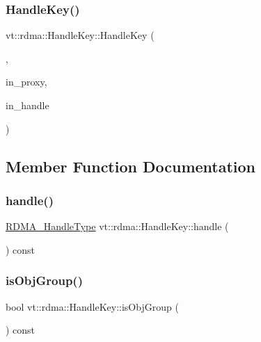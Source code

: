 \subsubsection{\texorpdfstring{Handle\+Key()}{HandleKey()}\hspace{0.1cm}{\footnotesize\ttfamily [3/3]}}
{\footnotesize\ttfamily vt\+::rdma\+::\+Handle\+Key\+::\+Handle\+Key (\begin{DoxyParamCaption}\item[{\hyperlink{structvt_1_1rdma_1_1_handle_key_1_1_collection_tag}{Collection\+Tag}}]{,  }\item[{\hyperlink{namespacevt_a1b417dd5d684f045bb58a0ede70045ac}{Virtual\+Proxy\+Type}}]{in\+\_\+proxy,  }\item[{\hyperlink{namespacevt_a10442579ec4e7ebef223818e64bcf908}{R\+D\+M\+A\+\_\+\+Handle\+Type}}]{in\+\_\+handle }\end{DoxyParamCaption})\hspace{0.3cm}{\ttfamily [inline]}}



\subsection{Member Function Documentation}
\mbox{\label{structvt_1_1rdma_1_1_handle_key_a242f0565b49f78b3574ff2a5dda04b83}} 
\subsubsection{\texorpdfstring{handle()}{handle()}}
{\footnotesize\ttfamily \hyperlink{namespacevt_a10442579ec4e7ebef223818e64bcf908}{R\+D\+M\+A\+\_\+\+Handle\+Type} vt\+::rdma\+::\+Handle\+Key\+::handle (\begin{DoxyParamCaption}{ }\end{DoxyParamCaption}) const\hspace{0.3cm}{\ttfamily [inline]}}

\mbox{\label{structvt_1_1rdma_1_1_handle_key_a22f6eb0a9075cf1e52b7660816b7fbdf}} 
\subsubsection{\texorpdfstring{is\+Obj\+Group()}{isObjGroup()}}
{\footnotesize\ttfamily bool vt\+::rdma\+::\+Handle\+Key\+::is\+Obj\+Group (\begin{DoxyParamCaption}{ }\end{DoxyParamCaption}) const\hspace{0.3cm}{\ttfamily [inline]}}

